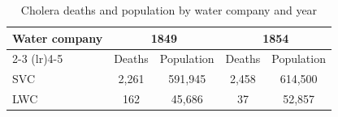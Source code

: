 \documentclass[11pt]{exam}
\begin{document}
    \begin{table}[ht]
    \centering
    \caption{Cholera deaths and population by water company and year}
    \label{tab:cholera-deaths-pop}
    \begin{tabular}{l cc cc}
        \toprule
        \textbf{Water company} & \multicolumn{2}{c}{\textbf{1849}} & \multicolumn{2}{c}{\textbf{1854}} \\
        \cmidrule(lr){2-3} \cmidrule(lr){4-5}
         & Deaths & Population & Deaths & Population \\
        \midrule
        SVC & 2,261 & 591,945 & 2,458 & 614,500 \\
        LWC & 162  & 45,686  & 37   & 52,857  \\
        \bottomrule
    \end{tabular}
    \end{table}
    \vspace{-0.5em}


\end{document}
